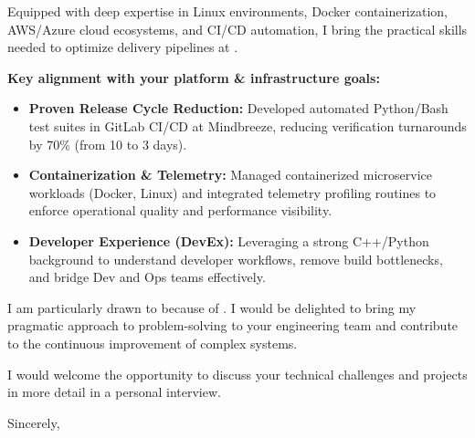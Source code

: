 \documentclass[11pt,a4paper]{article}
\begin{document}
Equipped with deep expertise in Linux environments, Docker containerization, AWS/Azure cloud ecosystems, and CI/CD automation, I bring the practical skills needed to optimize delivery pipelines at \textbf{\firmenName}.

\textbf{Key alignment with your platform \& infrastructure goals:}

\begin{itemize}[leftmargin=1.2em, itemsep=0.15em, parsep=0pt, topsep=0.2em]
    \item \textbf{Proven Release Cycle Reduction:} Developed automated Python/Bash test suites in GitLab CI/CD at Mindbreeze, reducing verification turnarounds by 70\% (from 10 to 3 days).
    \item \textbf{Containerization \& Telemetry:} Managed containerized microservice workloads (Docker, Linux) and integrated telemetry profiling routines to enforce operational quality and performance visibility.
    \item \textbf{Developer Experience (DevEx):} Leveraging a strong C++/Python background to understand developer workflows, remove build bottlenecks, and bridge Dev and Ops teams effectively.
\end{itemize}

I am particularly drawn to \firmenFlussbezug because of \textit{\firmenHighlight}. I would be delighted to bring my pragmatic approach to problem-solving to your engineering team and contribute to the continuous improvement of complex systems.

I would welcome the opportunity to discuss your technical challenges and projects in more detail in a personal interview.

\vspace{0.6em}

Sincerely,

\vspace{1.2em}

\textbf{\meinName}
\end{document}
